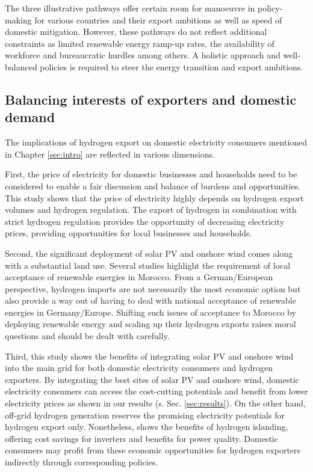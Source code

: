 The three illustrative pathways offer certain room for manoeuvre in policy-making for various countries and their export ambitions as well as speed of domestic mitigation. However, these pathways do not reflect additional constraints as limited renewable energy ramp-up rates, the availability of workforce and bureaucratic hurdles among others. A holistic approach and well-balanced policies is required to steer the energy transition and export ambitions.




\subsection{Balancing interests of exporters and domestic demand}
\label{subsec:balancedinterests}
The implications of hydrogen export on domestic electricity consumers mentioned in Chapter \ref{sec:intro} are reflected in various dimensions. 

First, the price of electricity for domestic businesses and households need to be considered to enable a fair discussion and balance of burdens and opportunities. This study shows that the price of electricity highly depends on hydrogen export volumes and hydrogen regulation. The export of hydrogen in combination with strict hydrogen regulation provides the opportunity of decreasing electricity prices, providing opportunities for local businesses and households.

Second, the significant deployment of solar PV and onshore wind comes along with a substantial land use. Several studies \cite{Terrapon-Pfaff2019, Hanger2016} highlight the requirement of local acceptance of renewable energies in Morocco. From a German/European perspective, hydrogen imports are not necessarily the most economic option \cite{Merten2023} but also provide a way out of having to deal with national acceptance of renewable energies in Germany/Europe.
Shifting such issues of acceptance to Morocco by deploying renewable energy and scaling up their hydrogen exports raises moral questions and should be dealt with carefully. %

Third, this study shows the benefits of integrating solar PV and onshore wind into the main grid for both domestic electricity consumers and hydrogen exporters. By integrating the best sites of solar PV and onshore wind, domestic electricity consumers can access the cost-cutting potentials and benefit from lower electricity prices as shown in our results (s. Sec. \ref{sec:results}). On the other hand, off-grid hydrogen generation reserves the promising electricity potentials for hydrogen export only. Nonetheless, \cite{Tries2023b} shows the benefits of hydrogen islanding, offering cost savings for inverters and benefits for power quality. Domestic consumers may profit from these economic opportunities for hydrogen exporters indirectly through corresponding policies.

